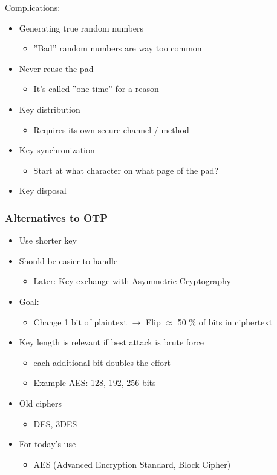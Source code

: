Complications:
\begin{itemize}
  \item Generating true random numbers
  \begin{itemize}
    \item ''Bad'' random numbers are way too common
  \end{itemize}
  \item Never reuse the pad
  \begin{itemize}
    \item It's called ''one time'' for a reason
  \end{itemize}
  \item Key distribution
  \begin{itemize}
    \item Requires its own secure channel / method
  \end{itemize}
  \item Key synchronization
  \begin{itemize}
    \item Start at what character on what page of the pad?
  \end{itemize}
  \item Key disposal
\end{itemize}

\subsubsection{Alternatives to OTP}
\begin{itemize}
  \item Use shorter key
  \item Should be easier to handle
  \begin{itemize}
    \item Later: Key exchange with Asymmetric Cryptography
  \end{itemize}
  \item Goal:
  \begin{itemize}
    \item Change 1 bit of plaintext $\rightarrow$ Flip $\approx$ 50 \% of bits in ciphertext
  \end{itemize}
  \item Key length is relevant if best attack is brute force
  \begin{itemize}
    \item each additional bit doubles the effort
    \item Example AES: 128, 192, 256 bits
  \end{itemize}
  \item Old ciphers
  \begin{itemize}
    \item DES, 3DES
  \end{itemize}
  \item For today's use
  \begin{itemize}
    \item AES (Advanced Encryption Standard, Block Cipher)
  \end{itemize}
\end{itemize}

